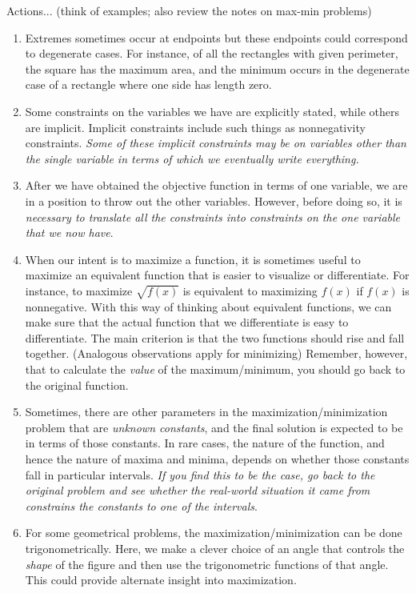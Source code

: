 \documentclass[10pt]{amsart}
\begin{document}
Actions... (think of examples; also review the notes on max-min problems)

\begin{enumerate}
\item Extremes sometimes occur at endpoints but these endpoints could
  correspond to degenerate cases. For instance, of all the rectangles
  with given perimeter, the square has the maximum area, and the
  minimum occurs in the degenerate case of a rectangle where one side
  has length zero.
\item Some constraints on the variables we have are explicitly stated,
  while others are implicit. Implicit constraints include such things
  as nonnegativity constraints. {\em Some of these implicit
  constraints may be on variables other than the single variable in
  terms of which we eventually write everything.}
\item After we have obtained the objective function in terms of one
  variable, we are in a position to throw out the other
  variables. However, before doing so, it is {\em necessary to
  translate all the constraints into constraints on the one variable
  that we now have}. 
\item When our intent is to maximize a function, it is sometimes
  useful to maximize an equivalent function that is easier to
  visualize or differentiate. For instance, to maximize $\sqrt{f(x)}$
  is equivalent to maximizing $f(x)$ if $f(x)$ is nonnegative. With
  this way of thinking about equivalent functions, we can make sure
  that the actual function that we differentiate is easy to
  differentiate. The main criterion is that the two functions should
  rise and fall together. (Analogous observations apply for
  minimizing) Remember, however, that to calculate the {\em value} of
  the maximum/minimum, you should go back to the original function.
\item Sometimes, there are other parameters in the
  maximization/minimization problem that are {\em unknown constants},
  and the final solution is expected to be in terms of those
  constants. In rare cases, the nature of the function, and hence the
  nature of maxima and minima, depends on whether those constants fall
  in particular intervals. {\em If you find this to be the case, go
  back to the original problem and see whether the real-world
  situation it came from constrains the constants to one of the
  intervals}.
\item For some geometrical problems, the maximization/minimization can
  be done trigonometrically. Here, we make a clever choice of an angle
  that controls the {\em shape} of the figure and then use the
  trigonometric functions of that angle. This could provide alternate
  insight into maximization.
\end{enumerate}
\end{document}
